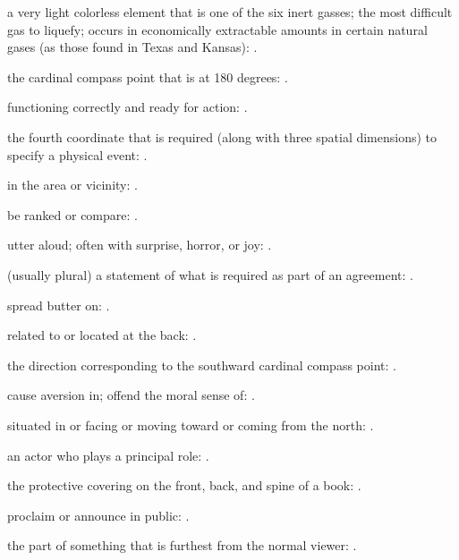   a very light colorless element that is one of the six inert gasses; the most difficult gas to liquefy; occurs in economically extractable amounts in certain natural gases (as those found in Texas and Kansas):   .

  the cardinal compass point that is at 180 degrees:   .

  functioning correctly and ready for action: .

  the fourth coordinate that is required (along with three spatial dimensions) to specify a physical event:   .

  in the area or vicinity:   .

  be ranked or compare: .

  utter aloud; often with surprise, horror, or joy:   .

  (usually plural) a statement of what is required as part of an agreement:   .

  spread butter on: .

  related to or located at the back: .

  the direction corresponding to the southward cardinal compass point: .

  cause aversion in; offend the moral sense of:   .

  situated in or facing or moving toward or coming from the north: .

  an actor who plays a principal role:   .

  the protective covering on the front, back, and spine of a book:   .

  proclaim or announce in public:   .

  the part of something that is furthest from the normal viewer:   .


